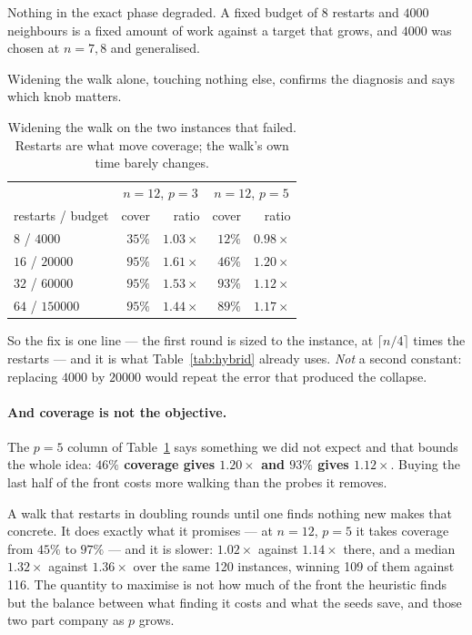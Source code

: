 \documentclass[11pt,a4paper]{article}
\begin{document}
\noindent
Nothing in the exact phase degraded.  A fixed budget of $8$ restarts and
$4000$ neighbours is a fixed amount of work against a target that grows, and
$4000$ was chosen at $n = 7,8$ and generalised.

Widening the walk alone, touching nothing else, confirms the diagnosis and
says which knob matters.

\begin{table}[h]
\centering
\caption{Widening the walk on the two instances that failed.  Restarts are what
move coverage; the walk's own time barely changes.}
\label{tab:widen}
\begin{tabular}{lrrrr}
\toprule
 & \multicolumn{2}{c}{$n=12$, $p=3$} & \multicolumn{2}{c}{$n=12$, $p=5$} \\
restarts / budget & cover & ratio & cover & ratio \\
\midrule
$8$ / $4000$     & $35\%$ & $1.03\times$ & $12\%$ & $0.98\times$ \\
$16$ / $20000$   & $95\%$ & $\mathbf{1.61\times}$ & $46\%$ & $\mathbf{1.20\times}$ \\
$32$ / $60000$   & $95\%$ & $1.53\times$ & $93\%$ & $1.12\times$ \\
$64$ / $150000$  & $95\%$ & $1.44\times$ & $89\%$ & $1.17\times$ \\
\bottomrule
\end{tabular}
\end{table}

\noindent
So the fix is one line --- the first round is sized to the instance, at
$\lceil n/4 \rceil$ times the restarts --- and it is what
Table~\ref{tab:hybrid} already uses.  \emph{Not} a second constant: replacing
$4000$ by $20000$ would repeat the error that produced the collapse.

\paragraph{And coverage is not the objective.}  The $p = 5$ column of
Table~\ref{tab:widen} says something we did not expect and that bounds the
whole idea: \textbf{$46\%$ coverage gives $1.20\times$ and $93\%$ gives
$1.12\times$}.  Buying the last half of the front costs more walking than the
probes it removes.

A walk that restarts in doubling rounds until one finds nothing new makes that
concrete.  It does exactly what it promises --- at $n=12$, $p=5$ it takes
coverage from $45\%$ to $97\%$ --- and it is slower: $1.02\times$ against
$1.14\times$ there, and a median $1.32\times$ against $1.36\times$ over the
same 120 instances, winning 109 of them against 116.  The quantity to
maximise is not how much of the front the heuristic finds but the balance
between what finding it costs and what the seeds save, and those two part
company as $p$ grows.
\end{document}
